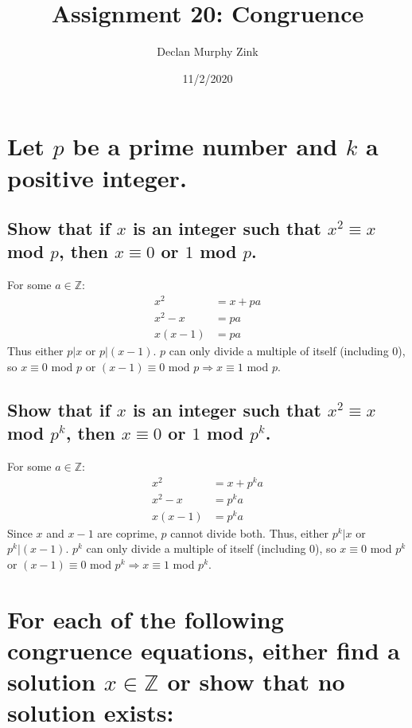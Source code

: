\documentclass[12pt]{article}
\begin{document}
\title{Assignment 20: Congruence}
\author{Declan Murphy Zink}
\date{11/2/2020}
\maketitle

\setcounter{section}{1}

\section{Let $p$ be a prime number and $k$ a positive integer.}
\subsection{Show that if $x$ is an integer such that $x^2 \equiv x $ mod $ p$, then $x \equiv 0$ or $1$ mod $p$.}
For some $a \in \mathds{Z}$:
\begin{align*}
    x^2 &= x + pa\\
    x^2 - x &= pa\\
    x(x-1) &= pa
\end{align*}
Thus either $p|x$ or $p|(x-1)$.
$p$ can only divide a multiple of itself (including 0),
so $x \equiv 0$ mod $p$ or $(x-1) \equiv 0$ mod $p \Rightarrow x \equiv 1$ mod $p$.

\subsection{Show that if $x$ is an integer such that $x^2 \equiv x$ mod $p^k$, then $x \equiv 0$ or $1$ mod $p^k$.}
For some $a \in \mathds{Z}$:
\begin{align*}
    x^2 &= x + p^ka\\
    x^2 - x &= p^ka\\
    x(x-1) &= p^ka
\end{align*}
Since $x$ and $x-1$ are coprime, $p$ cannot divide both.
Thus, either $p^k|x$ or $p^k|(x-1)$. 
$p^k$ can only divide a multiple of itself (including 0),
so $x \equiv 0$ mod $p^k$ or $(x-1) \equiv 0$ mod $p^k \Rightarrow x \equiv 1$ mod $p^k$.


\section{
    For each of the following congruence equations, either find a solution $x \in \mathds{Z}$ or show that no solution exists:
}
\end{document}
